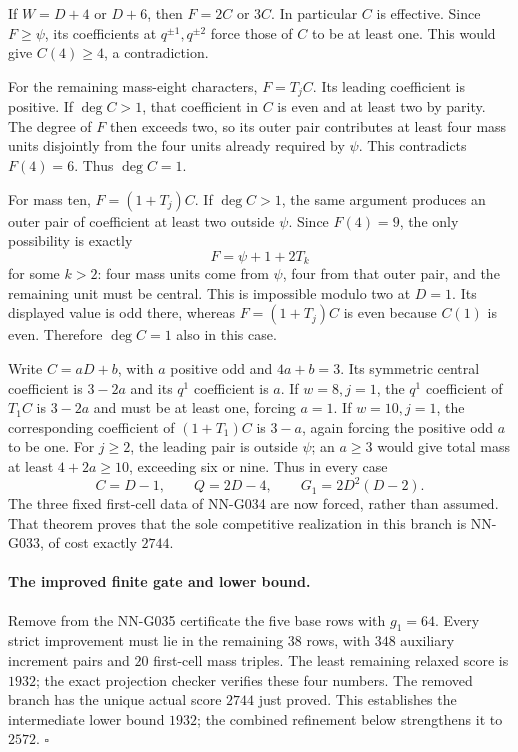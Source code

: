 If $W=D+4$ or $D+6$, then $F=2C$ or $3C$.
In particular $C$ is effective. Since $F\ge\psi$,
its coefficients at $q^{\pm1},q^{\pm2}$ force
those of $C$ to be at least one. This would give
$C(4)\ge4$, a contradiction.

For the remaining mass-eight characters,
$F=T_jC$. Its leading coefficient is positive.
If $\deg C>1$, that coefficient in $C$ is even
and at least two by parity. The degree of $F$
then exceeds two, so its outer pair contributes
at least four mass units disjointly from the four
units already required by $\psi$. This contradicts
$F(4)=6$. Thus $\deg C=1$.

For mass ten, $F=(1+T_j)C$. If $\deg C>1$,
the same argument produces an outer pair of
coefficient at least two outside $\psi$.
Since $F(4)=9$, the only possibility is exactly
\[
                         F=\psi+1+2T_k
\]
for some $k>2$: four mass units come from $\psi$,
four from that outer pair, and the remaining
unit must be central. This is impossible modulo
two at $D=1$. Its displayed value is odd there,
whereas $F=(1+T_j)C$ is even because $C(1)$ is
even. Therefore $\deg C=1$ also in this case.

Write $C=aD+b$, with $a$ positive odd and
$4a+b=3$. Its symmetric central coefficient is
$3-2a$ and its $q^1$ coefficient is $a$.
If $w=8,j=1$, the $q^1$ coefficient of $T_1C$
is $3-2a$ and must be at least one, forcing $a=1$.
If $w=10,j=1$, the corresponding coefficient of
$(1+T_1)C$ is $3-a$, again forcing the positive
odd $a$ to be one.
For $j\ge2$, the leading pair is outside $\psi$;
an $a\ge3$ would give total mass at least
$4+2a\ge10$, exceeding six or nine.
Thus in every case
\[
                  C=D-1,\qquad Q=2D-4,\qquad
                  G_1=2D^2(D-2).                    \tag{G036.4}
\]
The three fixed first-cell data of NN-G034 are now
forced, rather than assumed. That theorem proves
that the sole competitive realization in this
branch is NN-G033, of cost exactly $2744$.

\paragraph{The improved finite gate and lower bound.}
Remove from the NN-G035 certificate the five base
rows with $g_1=64$. Every strict improvement must
lie in the remaining $38$ rows, with $348$
auxiliary increment pairs and $20$ first-cell
mass triples. The least remaining relaxed score
is $1932$; the exact projection checker verifies
these four numbers. The removed branch has the
unique actual score $2744$ just proved. This establishes
the intermediate lower bound $1932$; the combined
refinement below strengthens it to $2572$.
\hfill$\square$

